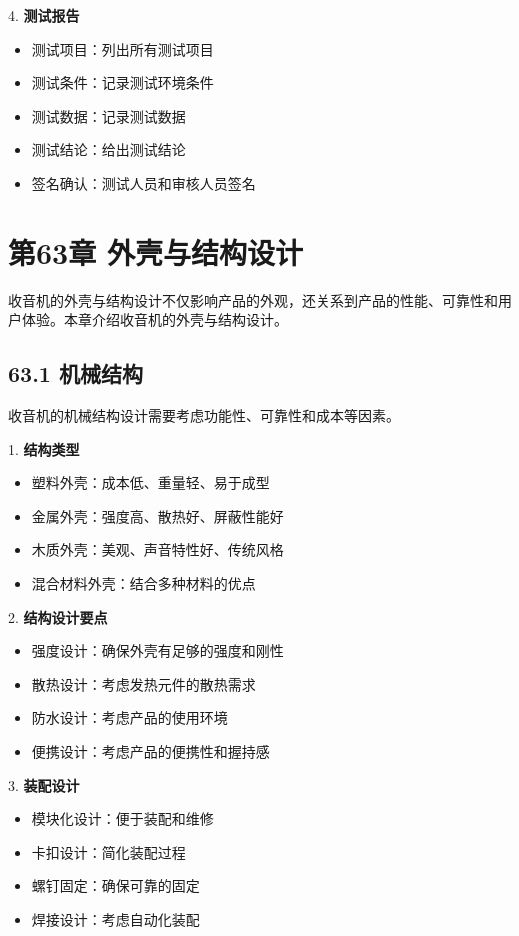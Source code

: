\documentclass[12pt,UTF8]{ctexbook}
\begin{document}
4. \textbf{测试报告}
   \begin{itemize}[leftmargin=3.5em]
   \item 测试项目：列出所有测试项目
   \item 测试条件：记录测试环境条件
   \item 测试数据：记录测试数据
   \item 测试结论：给出测试结论
   \item 签名确认：测试人员和审核人员签名
   \end{itemize}

\chapter*{第63章 外壳与结构设计}

收音机的外壳与结构设计不仅影响产品的外观，还关系到产品的性能、可靠性和用户体验。本章介绍收音机的外壳与结构设计。

\section*{63.1 机械结构}

收音机的机械结构设计需要考虑功能性、可靠性和成本等因素。

1. \textbf{结构类型}
   \begin{itemize}[leftmargin=3.5em]
   \item 塑料外壳：成本低、重量轻、易于成型
   \item 金属外壳：强度高、散热好、屏蔽性能好
   \item 木质外壳：美观、声音特性好、传统风格
   \item 混合材料外壳：结合多种材料的优点
   \end{itemize}

2. \textbf{结构设计要点}
   \begin{itemize}[leftmargin=3.5em]
   \item 强度设计：确保外壳有足够的强度和刚性
   \item 散热设计：考虑发热元件的散热需求
   \item 防水设计：考虑产品的使用环境
   \item 便携设计：考虑产品的便携性和握持感
   \end{itemize}

3. \textbf{装配设计}
   \begin{itemize}[leftmargin=3.5em]
   \item 模块化设计：便于装配和维修
   \item 卡扣设计：简化装配过程
   \item 螺钉固定：确保可靠的固定
   \item 焊接设计：考虑自动化装配
   \end{itemize}
\end{document}
